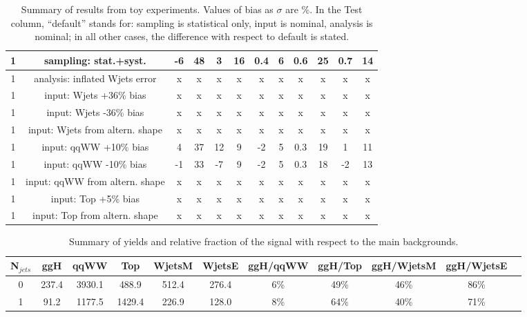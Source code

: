 \begin{table}
\begin{center}
\begin{tabular}{c | c  | c c | c c | c c | c c | c c }
1 & sampling: stat.+syst.               & -6  & 48 & 3   & 16 & 0.4 & 6 & 0.6  & 25 & 0.7& 14 \\
\hline
1 & analysis: inflated Wjets error      &  x  &  x & x   & x & x   & x  & x   & x  & x   & x\\ 
1 & input: Wjets +36\% bias             &  x  &  x & x   & x & x   & x  & x   & x  & x   & x\\ 
1 & input: Wjets -36\% bias             &  x  &  x & x   & x & x   & x  & x   & x  & x   & x\\ 
1 & input: Wjets from altern. shape     &  x  &  x & x   & x & x   & x  & x   & x  & x   & x\\
\hline
1 & input: qqWW +10\% bias              & 4   & 37 & 12  & 9 & -2  & 5  & 0.3  & 19 & 1  & 11 \\
1 & input: qqWW -10\% bias              & -1  & 33 & -7  & 9 & -2  & 5  & 0.3  & 18 & -2 & 13 \\
1 & input: qqWW from altern. shape      & x   & x  & x   & x & x   & x  & x    & x  & x & x \\
\hline
1 & input: Top +5\% bias                & x  & x & x & x & x & x & x  & x & x & x \\
1 & input: Top from altern. shape       & x  & x & x & x & x & x & x  & x & x & x \\
\hline
\hline
\end{tabular}
\caption{Summary of results from toy experiments. Values of bias as $\sigma$ are \%.
In the Test column, ``default'' stands for: sampling is statistical only, input is nominal, analysis is nominal; 
in all other cases, the difference with respect to default is stated.}
\label{tab:toy_summary}
\end{center}
\end{table}


\begin{table}
\begin{center}
\begin{tabular}{c | c c c c c | c  c  c c c }
\hline
N$_{jets}$ & ggH & qqWW & Top & WjetsM & WjetsE & ggH/qqWW & ggH/Top & ggH/WjetsM & ggH/WjetsE \\
\hline
0 & 237.4 & 3930.1 & 488.9  & 512.4 & 276.4 & 6\% & 49\% & 46\% &  86\%\\
1 & 91.2  & 1177.5 & 1429.4 & 226.9 & 128.0 & 8\% & 64\% & 40\% &  71\%\\
\hline
\end{tabular}
\caption{Summary of yields and relative fraction of the signal with respect to the main backgrounds.}
\label{tab:yield_summary}
\end{center}
\end{table}

